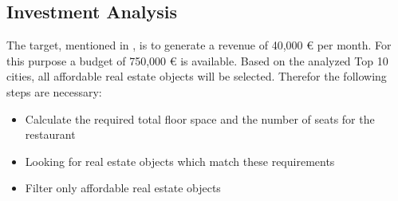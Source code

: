 \subsection{Investment Analysis}
\label{subsec:moneten}
The target, mentioned in , is to generate a revenue of 40,000 \euro{} per month. For this purpose
 a budget of 750,000 \euro{} is available. Based on the analyzed Top 10 cities, all affordable real estate objects will be
 selected. Therefor the following steps are necessary:
 \newline
 \begin{itemize}
   \item Calculate the required total floor space and the number of seats for the restaurant
   \item Looking for real estate objects which match these requirements
   \item Filter only affordable real estate objects
 \end{itemize}
